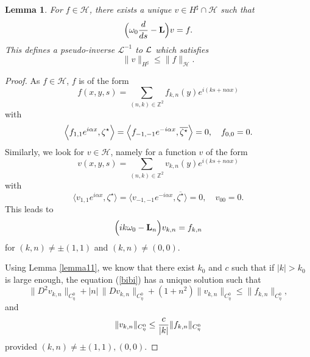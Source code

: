 \documentclass[11pt]{article}
\newtheorem{lemma}[theorem]{Lemma}
\begin{document}
\begin{lemma}
For $f \in \mathcal{H}$, there exists a unique $v \in H^\sharp \cap \mathcal{H}$ such that
$$
\Bigl( \omega_0 {d \over ds } - {\bf L} \Bigr) v = f.
$$
This defines a pseudo-inverse $\mathcal{L}^{-1}$ to ${\cal L}$ which satisfies
$$
\| v \|_{H^\sharp} \le \| f \|_{\mathcal{H}} .
$$
\end{lemma}



\begin{proof}
As $f \in \mathcal{H}$, $f$ is of the form
$$
f(x,y,s) = \sum_{(n,k) \in \mathbb{Z}^2} f_{k,n}(y) e^{i (k s + n \alpha x)} 
$$
with
$$
\Bigl\langle f_{1,1} e^{i \alpha x} , \zeta^\star \Bigr\rangle 
= \Bigl\langle f_{-1,-1} e^{-i \alpha x} , \overline{\zeta^\star} \Bigr\rangle
= 0,
\quad f_{0,0} = 0.
$$
Similarly, we look for $v \in \mathcal{H}$, namely for a function $v$ of the form
$$
v(x,y,s) = \sum_{(n,k) \in \mathbb{Z}^2} v_{k,n}(y) e^{i (k s + n \alpha x)} 
$$
with
$$
\Big\langle v_{1,1} e^{i \alpha x} , \zeta^\star \Big\rangle 
= \Big\langle v_{-1,-1} e^{-i \alpha x} , \overline{\zeta^\star} \Big\rangle
= 0,
\quad v_{00} = 0.
$$
This leads to
\begin{equation} \label{bibi}
\Bigl( i k \omega_0 - {\bf L}_n \Bigr) v_{k,n} = f_{k,n}
\end{equation}
for $(k,n) \ne \pm (1,1)$ and $(k,n) \ne (0,0)$.

Using Lemma \ref{lemma11}, we know that there exist $k_0$ and $c$
such that if $|k| > k_0$ is large enough, the equation (\ref{bibi})
has a unique solution such that
\begin{equation} \label{3}
\| D^2 v_{k,n} \|_{C^0_\eta}
+ |n| \, \| D v_{k,n} \|_{C^0_\eta}
+ (1 + n^2) \| v_{k,n} \|_{C^0_\eta}
\le \| f_{k,n} \|_{C^0_\eta},
\end{equation}
and
$$
\| v_{k,n} \|_{C^0_\eta} \le {c \over |k|}
\| f_{k,n} \|_{C^0_\eta}
$$
provided $(k,n) \ne \pm (1,1),  (0,0)$.




\end{proof}
\end{document}
